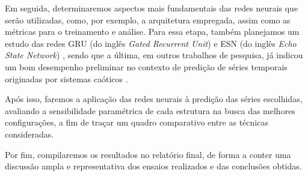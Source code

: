 \documentclass[a4paper, 12pt]{article}
\begin{document}
Em seguida, determinaremos aspectos mais fundamentais das redes neurais que serão utilizadas, como, por exemplo, a arquitetura empregada, assim como as métricas para o treinamento e análise. Para essa etapa, também planejamos um estudo das redes GRU (do inglês \textit{Gated Recurrent Unit}) \cite{cho2014learning} e ESN (do inglês \textit{Echo State Network}) \cite{jaeger2007echo}, sendo que a última, em outros trabalhos de pesquisa, já indicou um bom desempenho preliminar no contexto de predição de séries temporais originadas por sistemas caóticos \cite{boccato2013novas}.

Após isso, faremos a aplicação das redes neurais à predição das séries escolhidas, avaliando a sensibilidade paramétrica de cada estrutura na busca das melhores configurações, a fim de traçar um quadro comparativo entre as técnicas consideradas. 

Por fim, compilaremos os resultados no relatório final, de forma a conter uma discussão ampla e representativa dos ensaios realizados e das conclusões obtidas. 




\end{document}
